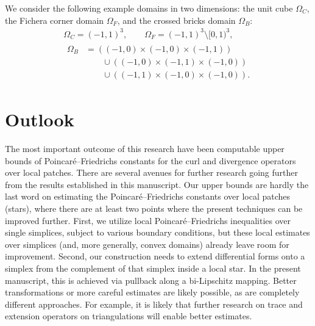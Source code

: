 \documentclass[10pt,letterpaper]{article}
\newcommand{\mwl}[1]{{\color{red}#1}}
\begin{document}
We consider the following example domains in two dimensions:
the unit cube $\Omega_C$, the Fichera corner domain $\Omega_F$, and the crossed bricks domain $\Omega_{B}$:
\begin{gather*}
    \Omega_{C}  = (-1,1)^3,
    \qquad 
    \Omega_{F}  = (-1,1)^3 \setminus [0,1)^3,
    \\
    \begin{aligned}
    \Omega_{B} &= 
    \left( (-1,0) \times (-1,0) \times (-1,1) \right)
    \\&\qquad
    \cup 
    \left( (-1,0) \times (-1,1) \times (-1,0) \right)
    \\&\qquad
    \cup 
    \left( (-1,1) \times (-1,0) \times (-1,0) \right)
    .
    \end{aligned}
\end{gather*}





\section{Outlook}\label{section:outlook}

The most important outcome of this research have been computable upper bounds of Poincar\'e--Friedrichs constants for the curl and divergence operators over local patches. 
There are several avenues for further research going further from the results established in this manuscript.
Our upper bounds are hardly the last word on estimating the Poincar\'e--Friedrichs constants over local patches (stars), where there are at least two points where the present techniques can be improved further. First, we utilize local Poincar\'e--Friedrichs inequalities over single simplices, subject to various boundary conditions, but these local estimates over simplices (and, more generally, convex domains) \mwl{already} leave room for improvement.
Second, our construction needs to extend differential forms onto a simplex from the complement of that simplex inside a local star. In the present manuscript, this is achieved via pullback along a bi-Lipschitz mapping. 
Better transformations or more careful estimates are likely possible, as are completely different approaches. For example, it is likely that further research on trace and extension operators on triangulations will enable better estimates.
\end{document}
